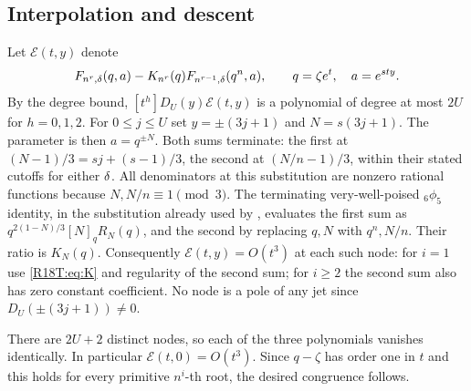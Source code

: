 \documentclass[11pt,a4paper]{article}
\begin{document}
\subsection{Interpolation and descent}
Let \(\mathcal E(t,y)\) denote
\[
 F_{n^r,\delta}(q,a)-K_{n^r}(q)F_{n^{r-1},\delta}(q^n,a),
 \qquad q=\zeta e^t,\quad a=e^{sty}.
\]
By the degree bound, \([t^h]D_U(y)\mathcal E(t,y)\) is a polynomial
of degree at most \(2U\) for \(h=0,1,2\).
For \(0\le j\le U\) set \(y=\pm(3j+1)\) and \(N=s(3j+1)\).
The parameter is then \(a=q^{\pm N}\). Both sums terminate:
the first at \((N-1)/3=sj+(s-1)/3\), the second at
\((N/n-1)/3\), within their stated cutoffs for either \(\delta\).
All denominators at this substitution are nonzero rational functions
because \(N,N/n\equiv1\pmod3\).
The terminating very-well-poised \({}_6\phi_5\) identity,
in the substitution already used by \cite[proof of Theorem 1.2]{R18T:GS},
evaluates the first sum as
\(q^{2(1-N)/3}[N]_qR_N(q)\), and the second by replacing \(q,N\)
with \(q^n,N/n\). Their ratio is \(K_N(q)\).
Consequently \(\mathcal E(t,y)=O(t^3)\) at each such node:
for \(i=1\) use \eqref{R18T:eq:K} and regularity of the second sum;
for \(i\ge2\) the second sum also has zero constant coefficient.
No node is a pole of any jet since \(D_U(\pm(3j+1))\ne0\).

There are \(2U+2\) distinct nodes, so each of the three polynomials
vanishes identically. In particular \(\mathcal E(t,0)=O(t^3)\).
Since \(q-\zeta\) has order one in \(t\) and this holds for every
primitive \(n^i\)-th root, the desired congruence follows.
\end{document}
